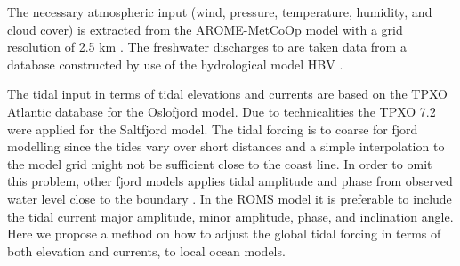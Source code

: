 The necessary atmospheric input (wind, pressure, temperature, humidity, and cloud cover) is extracted from the AROME-MetCoOp model with a grid resolution of 2.5 km \cite[]{muller2015}. The freshwater discharges to are taken data from a database constructed by use of the hydrological model HBV \cite[]{beldring2003}.

The tidal input in terms of tidal elevations and currents are based on the TPXO Atlantic database \cite[]{egbert02} for the Oslofjord model. Due to technicalities the TPXO 7.2 were applied for the Saltfjord model. The tidal forcing is to coarse for fjord modelling since the tides vary over short distances and a simple interpolation to the model grid might not be sufficient close to the coast line. In order to omit this problem, other fjord models applies tidal amplitude and phase from observed water level close to the boundary \cite[i.e.]{svendsen96,lynge13}. In the ROMS model it is preferable to include the tidal current major amplitude, minor amplitude, phase, and inclination angle. Here we propose a method on how to adjust the global tidal forcing in terms of both elevation and currents, to local ocean models. 
